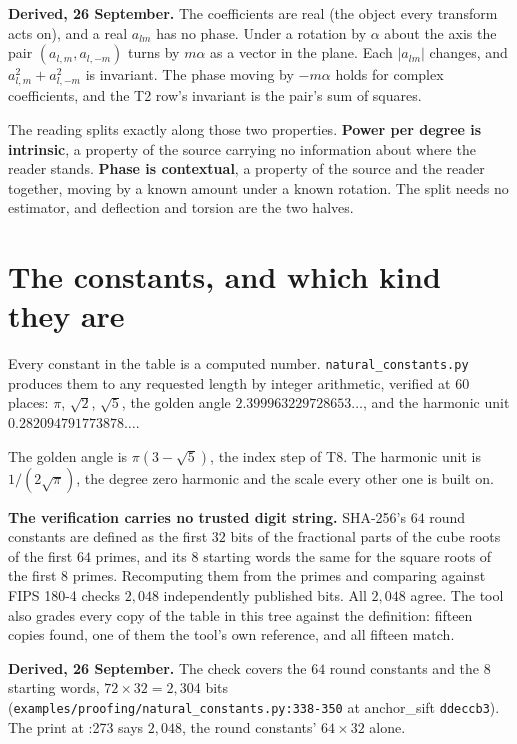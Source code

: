 \textbf{Derived, 26 September.} The coefficients are real (the object every transform acts on), and a real \(a_{lm}\) has no phase. Under a rotation by \(\alpha\) about the axis the pair \((a_{l,m}, a_{l,-m})\) turns by \(m\alpha\) as a vector in the plane. Each \(|a_{lm}|\) changes, and \(a_{l,m}^2 + a_{l,-m}^2\) is invariant. The phase moving by \(-m\alpha\) holds for complex coefficients, and the T2 row's invariant is the pair's sum of squares.

The reading splits exactly along those two properties. \textbf{Power per degree is intrinsic}, a property of the source carrying no information about where the reader stands. \textbf{Phase is contextual}, a property of the source and the reader together, moving by a known amount under a known rotation. The split needs no estimator, and deflection and torsion are the two halves.

\section{The constants, and which kind they are}

Every constant in the table is a computed number. \texttt{natural\_constants.py} produces them to any requested length by integer arithmetic, verified at \(60\) places: \(\pi\), \(\sqrt{2}\), \(\sqrt{5}\), the golden angle \(2.399963229728653\ldots\), and the harmonic unit \(0.282094791773878\ldots\).

The golden angle is \(\pi(3 - \sqrt{5})\), the index step of T8. The harmonic unit is \(1/(2\sqrt{\pi})\), the degree zero harmonic and the scale every other one is built on.

\textbf{The verification carries no trusted digit string.} SHA-256's \(64\) round constants are defined as the first \(32\) bits of the fractional parts of the cube roots of the first \(64\) primes, and its \(8\) starting words the same for the square roots of the first \(8\) primes. Recomputing them from the primes and comparing against FIPS 180-4 checks \(2{,}048\) independently published bits. All \(2{,}048\) agree. The tool also grades every copy of the table in this tree against the definition: fifteen copies found, one of them the tool's own reference, and all fifteen match.

\textbf{Derived, 26 September.} The check covers the \(64\) round constants and the \(8\) starting words, \(72 \times 32 = 2{,}304\) bits (\texttt{examples/\allowbreak{}proofing/\allowbreak{}natural\_constants.py:338-350} at anchor\_sift \texttt{ddeccb3}). The print at :273 says \(2{,}048\), the round constants' \(64 \times 32\) alone.

